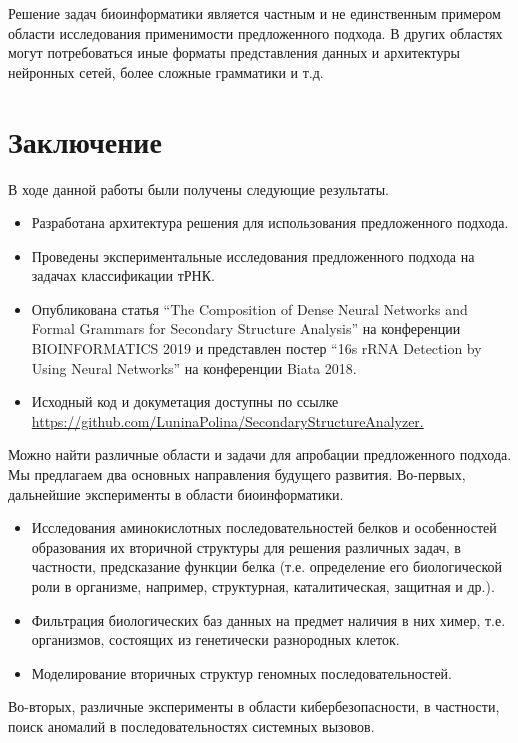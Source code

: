 Решение задач биоинформатики является частным и не единственным примером области исследования применимости предложенного подхода. В других областях могут потребоваться иные форматы представления данных и архитектуры нейронных сетей, более сложные грамматики и т.д.


\section*{Заключение}
В ходе данной работы были получены следующие результаты.
\begin{itemize}
    \item Разработана архитектура решения для использования предложенного подхода.
    \item Проведены экспериментальные исследования предложенного подхода на задачах классификации тРНК.
    \item Опубликована статья ``The Composition of Dense Neural Networks and Formal Grammars for Secondary Structure Analysis'' на конференции BIOINFORMATICS 2019 и представлен постер ``16s rRNA Detection by Using Neural Networks'' на конференции Biata 2018.
    \item Исходный код и докуметация доступны по ссылке \url{https://github.com/LuninaPolina/SecondaryStructureAnalyzer.}
\end{itemize}


Можно найти различные области и задачи для апробации предложенного подхода. Мы предлагаем два основных направления будущего развития. Во-первых, дальнейшие эксперименты в области биоинформатики.
\begin{itemize}
    \item Исследования аминокислотных последовательностей белков и особенностей образования их вторичной структуры для решения различных задач, в частности, предсказание функции белка (т.е. определение его биологической роли в организме, например, структурная, каталитическая, защитная и др.).
    \item Фильтрация биологических баз данных на предмет наличия в них химер, т.е. организмов, состоящих из генетически разнородных клеток.
    \item Моделирование вторичных структур геномных последовательностей.
\end{itemize}
 Во-вторых, различные эксперименты в области кибербезопасности, в частности, поиск аномалий в последовательностях системных вызовов.



\renewcommand\refname{Список литературы}

